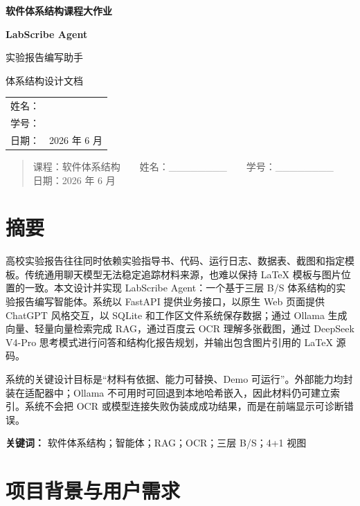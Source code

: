 \documentclass[12pt,a4paper]{ctexart}
\begin{document}
\begin{titlepage}
\centering
\vspace*{2.2cm}
{\Large\bfseries 软件体系结构课程大作业\par}
\vspace{2.2cm}
{\color{LabGreen}\Huge\bfseries LabScribe Agent\par}
\vspace{0.6cm}
{\LARGE 实验报告编写助手\par}
\vspace{0.4cm}
{\LARGE 体系结构设计文档\par}
\vfill
\renewcommand{\arraystretch}{1.8}
\begin{tabular}{rl}
姓名：& \underline{\hspace{6cm}}\\
学号：& \underline{\hspace{6cm}}\\
日期：& 2026 年 6 月\\
\end{tabular}
\vspace{2cm}
\end{titlepage}
\tableofcontents
\clearpage

\begin{quote}\small 课程：软件体系结构　　姓名：\_\_\_\_\_\_\_\_　　学号：\_\_\_\_\_\_\_\_　　日期：2026 年 6 月\end{quote}
\section{摘要}
高校实验报告往往同时依赖实验指导书、代码、运行日志、数据表、截图和指定模板。传统通用聊天模型无法稳定追踪材料来源，也难以保持 LaTeX 模板与图片位置的一致。本文设计并实现 LabScribe Agent：一个基于三层 B/S 体系结构的实验报告编写智能体。系统以 FastAPI 提供业务接口，以原生 Web 页面提供 ChatGPT 风格交互，以 SQLite 和工作区文件系统保存数据；通过 Ollama 生成向量、轻量向量检索完成 RAG，通过百度云 OCR 理解多张截图，通过 DeepSeek V4-Pro 思考模式进行问答和结构化报告规划，并输出包含图片引用的 LaTeX 源码。

系统的关键设计目标是“材料有依据、能力可替换、Demo 可运行”。外部能力均封装在适配器中；Ollama 不可用时可回退到本地哈希嵌入，因此材料仍可建立索引。系统不会把 OCR 或模型连接失败伪装成成功结果，而是在前端显示可诊断错误。

\textbf{关键词：} 软件体系结构；智能体；RAG；OCR；三层 B/S；4+1 视图

\section{项目背景与用户需求}
\end{document}
